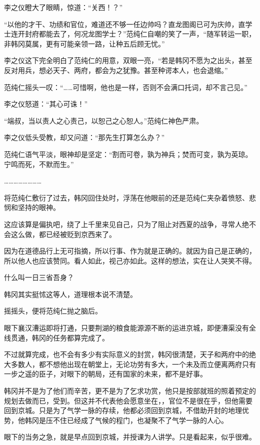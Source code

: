 李之仪瞪大了眼睛，惊道：“关西！？”

“以他的才干、功绩和官位，难道还不够一任边帅吗？直龙图阁已可为庆帅，直学士连开封府都能去了，何况龙图学士？”范纯仁自嘲的笑了一声，“随军转运一职，非韩冈莫属，更有可能亲领一路，让种五后顾无忧。”

李之仪这下完全明白了范纯仁的用意，双眼一亮，“若是韩冈不愿为之出头，甚至反对用兵，想必天子、两府，都会为之犹豫。甚至种谔本人，也会退缩。”

范纯仁摇头一叹：“……可惜啊，他也是一样，否则不会满口托词，却不言己见。”

李之仪怒道：“其心可诛！”

“端叔，当以责人之心责己，以恕己之心恕人。”范纯仁神色严肃。

李之仪低头受教，却又问道：“那先生打算怎么办？”

范纯仁语气平淡，眼神却是坚定：“割而可卷，孰为神兵；焚而可变，孰为英琼。宁鸣而死，不默而生。”

……………………

将范纯仁敷衍了过去，韩冈回住处时，浮荡在他眼前的还是范纯仁夹杂着愤怒、悲悯和坚持的眼神。

这应该算是偏执吧，绕了上千里来见自己，只为了阻止对西夏的战争，寻常人绝不会这么做，都已经被贬到京西来了。

因为在道德品行上无可指摘，所以行事、作为就是正确的。就因为自己是正确的，所以他人也应该赞同。看人如此，视己亦如此。这样的想法，实在让人哭笑不得。

什么叫一日三省吾身？

韩冈其实挺怵这等人，道理根本说不清楚。

摇摇头，便将范纯仁抛之脑后。

眼下襄汉漕运即将打通，只要荆湖的粮食能源源不断的运进京城，即便漕渠没有全线贯通，韩冈的任务都算完成了。

不过就算完成，也不会有多少有实际意义的封赏，韩冈很清楚，天子和两府中的绝大多数人，都不想他出现在朝堂上，无论功劳有多大，一个未及而立便离两府只有一步之遥的臣子，对眼下的朝局，还有国家的未来，都不是好事。

韩冈并不是为了他们而辛苦，更不是为了乞求功赏，他只是按部就班的照着预定的规划去做而已，受到。但这并不代表他会愿意坐在，，官位不是很在乎，但他需要回到京城。只是为了气学一脉的存续，他都必须回到京城，不借助开封的地理优势，他韩冈是压不住已经成了气候的程门，也凝聚不了气学一脉的人心。

眼下的当务之急，就是早点回到京城，并授课为人讲学。只是看起来，似乎很难。

